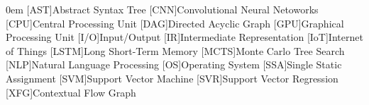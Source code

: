 \begin{acronym}[LSTM]\itemsep0em
    [AST]{Abstract Syntax Tree}
    [CNN]{Convolutional Neural Netoworks}
    [CPU]{Central Processing Unit}
    [DAG]{Directed Acyclic Graph}
    [GPU]{Graphical Processing Unit}
    [I/O]{Input/Output}
    [IR]{Intermediate Representation}
    [IoT]{Internet of Things}
    [LSTM]{Long Short-Term Memory}
    [MCTS]{Monte Carlo Tree Search}
    [NLP]{Natural Language Processing}
    [OS]{Operating System}
    [SSA]{Single Static Assignment}
    [SVM]{Support Vector Machine}
    [SVR]{Support Vector Regression}
    [XFG]{Contextual Flow Graph}
\end{acronym}
